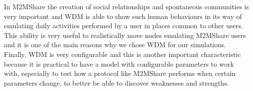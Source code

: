 In M2MShare the creation of social relationships and spontaneous communities is very important and WDM is able to show such human behaviours in its way of emulating daily activities performed by a user in places common to other users. This ability is very useful to realistically move nodes emulating M2MShare users and it is one of the main reasons why we chose WDM for our simulations.
\\

Finally, WDM is very configurable and this is another important characteristic because it is practical to have a model with configurable parameters to work with, especially to test how a protocol like M2MShare performs when certain parameters change, to better be able to discover weaknesses and strengths.
 






